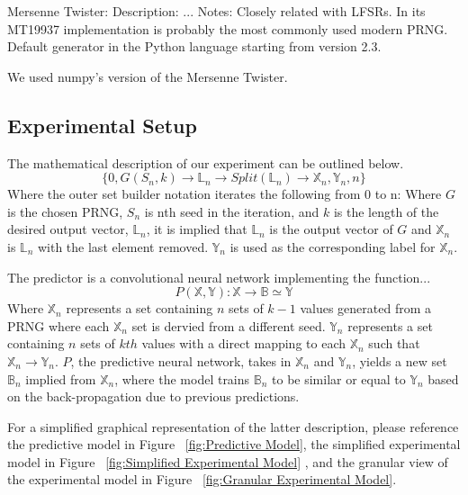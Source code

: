 \documentclass[conference]{IEEEtran}
\begin{document}
Mersenne Twister:
Description:
...
Notes:
Closely related with LFSRs. In its MT19937 implementation is probably the most commonly used modern PRNG. 
Default generator in the Python language starting from version 2.3. 

We used numpy's version of the Mersenne Twister.

\subsection{Experimental Setup}

The mathematical description of our experiment can be outlined below. 
\begin{equation}
\{0, G(S_n, k) \rightarrow \mathbb{L}_n \rightarrow Split(\mathbb{L}_n) \rightarrow \mathbb{X}_n,\mathbb{Y}_n , n \}
\end{equation}
Where the outer set builder notation iterates the following from 0 to n:
Where $G$ is the chosen PRNG, $S_n$ is nth seed in the iteration, and $k$ is the length of the desired output vector, $\mathbb{L}_n$, it is implied that $\mathbb{L}_n$ is the output vector of $G$ and $\mathbb{X}_n$ is $\mathbb{L}_n$ with the last element removed. $\mathbb{Y}_n$  is  used  as  the  corresponding  label for $\mathbb{X}_n$.

The predictor is a convolutional neural network implementing the function...
\begin{equation}
P(\mathbb{X},\mathbb{Y}): \mathbb{X} \rightarrow \mathbb{B} \simeq \mathbb{Y}
\end{equation}
Where $\mathbb{X}_n$ represents a set containing $n$ sets of $k-1$ values generated from a PRNG where each $\mathbb{X}_n$ set is dervied from a different seed. $\mathbb{Y}_n$ represents a set containing $n$ sets of $kth$ values with a direct mapping to each $\mathbb{X}_n$ such that $\mathbb{X}_n \rightarrow \mathbb{Y}_n$. $P$, the predictive neural network, takes in $\mathbb{X}_n$ and $\mathbb{Y}_n$, yields a new set $\mathbb{B}_n$ implied from $\mathbb{X}_n$, where the model trains $\mathbb{B}_n$ to be similar or equal to $\mathbb{Y}_n$ based on the back-propagation due to previous predictions. 

For a simplified graphical representation of the latter description, please reference the predictive model in Figure ~\ref{fig:Predictive Model}, the simplified experimental model in Figure ~\ref{fig:Simplified Experimental Model} , and the granular view of the experimental model in Figure ~\ref{fig:Granular Experimental Model}.
\end{document}
